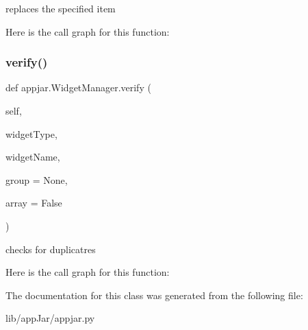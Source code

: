 \begin{DoxyVerb}replaces the specified item \end{DoxyVerb}
 Here is the call graph for this function\+:
\mbox{\label{classappjar_1_1_widget_manager_a267493893f210a5176a30793a32618c6}} 
\subsubsection{\texorpdfstring{verify()}{verify()}}
{\footnotesize\ttfamily def appjar.\+Widget\+Manager.\+verify (\begin{DoxyParamCaption}\item[{}]{self,  }\item[{}]{widget\+Type,  }\item[{}]{widget\+Name,  }\item[{}]{group = {\ttfamily None},  }\item[{}]{array = {\ttfamily False} }\end{DoxyParamCaption})}

\begin{DoxyVerb}checks for duplicatres \end{DoxyVerb}
 Here is the call graph for this function\+:


The documentation for this class was generated from the following file\+:\begin{DoxyCompactItemize}
\item 
lib/app\+Jar/appjar.\+py\end{DoxyCompactItemize}
